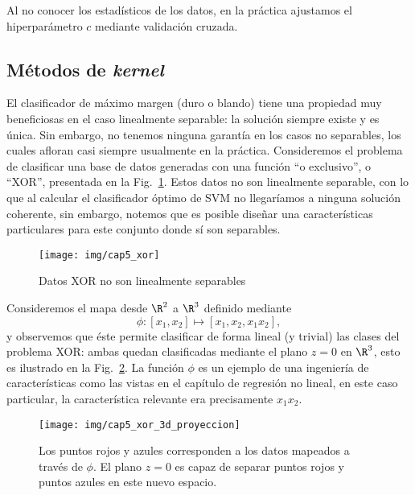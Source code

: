 Al no conocer los estadísticos de los datos, en la práctica ajustamos el hiperparámetro $c$ mediante validación cruzada.

\subsection{Métodos de \emph{kernel}}

El clasificador de máximo margen (duro o blando) tiene una propiedad muy beneficiosas en el caso linealmente separable: la solución siempre existe y es única. Sin embargo, no tenemos ninguna garantía en los casos no separables, los cuales afloran casi siempre usualmente en la práctica. Consideremos el problema de clasificar una base de datos generadas con una función ``o exclusivo'', o ``XOR'', presentada en la Fig.~\ref{fig:xor}. Estos datos no son linealmente separable, con lo que al calcular el clasificador óptimo  de SVM no llegaríamos a ninguna solución coherente, sin embargo, notemos que es posible diseñar una características particulares para este conjunto donde sí son separables. 


\begin{figure}[ht]
    \centering
    \texttt{[image: img/cap5\_xor]}
    \caption{Datos XOR no son linealmente separables}
    \label{fig:xor}
\end{figure}

Consideremos el mapa desde  $\R^2$ a $\R^3$ definido mediante
\begin{equation}
    \phi: [x_1, x_2] \mapsto [x_1, x_2, x_1 x_2],
\end{equation}
y observemos que éste permite clasificar de forma lineal (y trivial) las clases del problema XOR: ambas quedan clasificadas mediante el plano $z=0$ en $\R^3$, esto es ilustrado en la Fig.~\ref{fig:xor_proyectado}. La función $\phi$ es un ejemplo de una ingeniería de características como las vistas en el capítulo de regresión no lineal, en este caso particular, la característica relevante era precisamente $x_1x_2$.

\begin{figure}[ht]
    \centering
    \texttt{[image: img/cap5\_xor\_3d\_proyeccion]}
    \caption{Los puntos rojos y azules corresponden a los datos mapeados a través de $\phi$. El plano $z=0$ es capaz de separar puntos rojos y puntos azules en este nuevo espacio.}
    \label{fig:xor_proyectado}
\end{figure}


